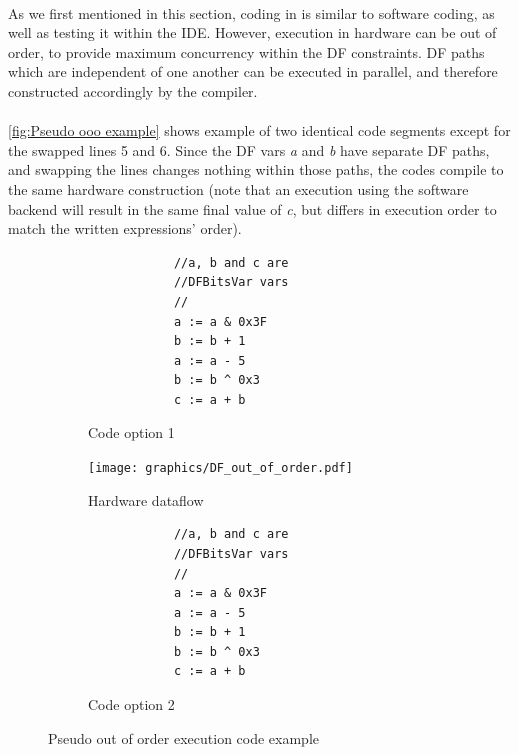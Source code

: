 \paragraph{}As we first mentioned in this section, coding in \cf is similar to software coding, as well as testing it within the IDE. However, execution in hardware can be out of order, to provide maximum concurrency within the DF constraints. DF paths which are independent of one another can be executed in parallel, and therefore constructed accordingly by the \cf compiler.

\paragraph{}\autoref{fig:Pseudo ooo example} shows example of two identical code segments except for the swapped lines 5 and 6. Since the DF vars \textit{a} and \textit{b} have separate DF paths, and swapping the lines changes nothing within those paths, the codes compile to the same hardware construction (note that an execution using the software backend will result in the same final value of \textit{c}, but differs in execution order to match the written expressions' order).
\begin{figure}[h]
	\centering
	\begin{subfigure}[b]{0.30\textwidth}
		\begin{verbatim}
			//a, b and c are 
			//DFBitsVar vars
			//
			a := a & 0x3F
			b := b + 1
			a := a - 5
			b := b ^ 0x3
			c := a + b
		\end{verbatim}
		\caption{Code option 1}
		\vspace*{4mm}
	\end{subfigure}%
	\hfill
	\begin{subfigure}[b]{0.32\textwidth}
		\texttt{[image: graphics/DF\_out\_of\_order.pdf]}
		\caption{Hardware dataflow}
		\vspace*{4mm}
	\end{subfigure}%
	\hfill
	\begin{subfigure}[b]{0.30\textwidth}
		\begin{verbatim}
			//a, b and c are 
			//DFBitsVar vars
			//
			a := a & 0x3F
			a := a - 5
			b := b + 1
			b := b ^ 0x3
			c := a + b
		\end{verbatim}
		\caption{Code option 2}
		\vspace*{4mm}
	\end{subfigure}
	\caption{Pseudo out of order execution code example}\label{fig:Pseudo ooo example}
\end{figure}

